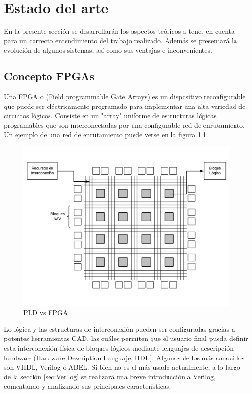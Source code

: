 
\chapter{Estado del arte}\label{sec:Estado_arte}
En la presente sección se desarrollarán los aspectos teóricos a tener en cuenta para un correcto entendimiento del trabajo realizado. Además se presentará la evolución de algunos sistemas, así como sus ventajas e inconvenientes.
\section{Concepto FPGAs}
Una FPGA o (Field programmable Gate Arrays) es un dispositivo reconfigurable que puede ser eléctricamente programado para implementar una alta variedad de circuitos lógicos. Consiste en un "array" uniforme de estructuras lógicas programables que son interconectadas por una configurable red de enrutamiento. Un ejemplo de una red de enrutamiento puede verse en la figura \ref{fig:estructura_FPGA}.

\begin{center}
	\begin{figure}[H]
		\center
		\includegraphics[trim = 0mm 10mm 0mm 10mm, clip,scale=0.4]{imagenes/EstadoArte/estructura_FPGA.pdf}
		\caption{PLD vs FPGA}
		\label{fig:estructura_FPGA}
	\end{figure}
\end{center}
 Lo lógica y las estructuras de interconexión pueden ser configuradas gracias a potentes herramientas CAD, las cuáles permiten que el usuario final pueda definir esta interconexión física de bloques lógicos mediante lenguajes de descripción hardware (Hardware Description Languaje, HDL). Algunos de los más conocidos son VHDL, Verilog o ABEL. 
\newline
Si bien no es el más usado actualmente, a lo largo de la sección \ref{sec:Verilog} se realizará una breve introducción a Verilog, comentando y analizando sus principales características.
